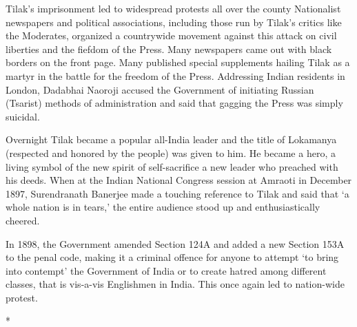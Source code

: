 Tilak's imprisonment led to widespread protests all over the county Nationalist newspapers and political associations, including those run by Tilak's critics like the Moderates, organized a countrywide movement against this attack on civil liberties and the fiefdom of the Press. Many newspapers came out with black borders on the front page. Many published special supplements hailing Tilak as a martyr in the battle for the freedom of the Press. Addressing Indian residents in London, Dadabhai Naoroji accused the Government of initiating Russian (Tsarist) methods of administration and said that gagging the Press was simply suicidal.

Overnight Tilak became a popular all-India leader and the title of Lokamanya (respected and honored by the people) was given to him. He became a hero, a living symbol of the new spirit of self-sacrifice a new leader who preached with his deeds. When at the Indian National Congress session at Amraoti in December 1897, Surendranath Banerjee made a touching reference to Tilak and said that `a whole nation is in tears,' the entire audience stood up and enthusiastically cheered.

In 1898, the Government amended Section 124A and added a new Section 153A to the penal code, making it a criminal offence for anyone to attempt `to bring into contempt' the Government of India or to create hatred among different classes, that is vis-a-vis Englishmen in India. This once again led to nation-wide protest.

\begin{center}*\end{center}

